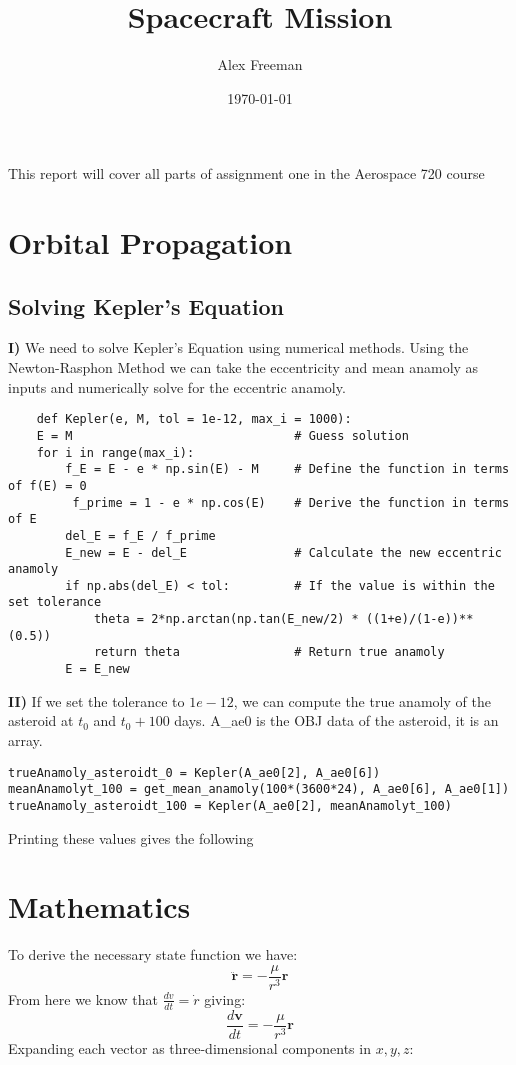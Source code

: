 \documentclass[a4paper, 12pt]{article}  %
\title{Spacecraft Mission}
\author{Alex Freeman}
\date{\today}
\begin{document}
\maketitle


This report will cover all parts of assignment one in the Aerospace 720 course

\section{Orbital Propagation}

\subsection{Solving Kepler's Equation}

\textbf{I)} We need to solve Kepler's Equation using numerical methods. Using the Newton-Rasphon Method we can take the eccentricity and mean anamoly as 
inputs and numerically solve for the eccentric anamoly. 

\begin{lstlisting}
    def Kepler(e, M, tol = 1e-12, max_i = 1000):
    E = M                               # Guess solution
    for i in range(max_i):
        f_E = E - e * np.sin(E) - M     # Define the function in terms of f(E) = 0
         f_prime = 1 - e * np.cos(E)    # Derive the function in terms of E
        del_E = f_E / f_prime           
        E_new = E - del_E               # Calculate the new eccentric anamoly
        if np.abs(del_E) < tol:         # If the value is within the set tolerance 
            theta = 2*np.arctan(np.tan(E_new/2) * ((1+e)/(1-e))**(0.5))
            return theta                # Return true anamoly
        E = E_new
\end{lstlisting}

\noindent \textbf{II)} If we set the tolerance to $1e-12$, we can compute the true anamoly of the asteroid 
at $t_0$ and $t_0 + 100$ days. A\_ae0 is the OBJ data of the asteroid, it is an array.
\begin{lstlisting}
trueAnamoly_asteroidt_0 = Kepler(A_ae0[2], A_ae0[6])  
meanAnamolyt_100 = get_mean_anamoly(100*(3600*24), A_ae0[6], A_ae0[1])
trueAnamoly_asteroidt_100 = Kepler(A_ae0[2], meanAnamolyt_100)
\end{lstlisting}
Printing these values gives the following



\section{Mathematics}
To derive the necessary state function we have:
\begin{equation}
    \ddot{\mathbf{r}} = -\frac{\mu}{r^3} \mathbf{r}
\end{equation}
From here we know that $\frac{dv}{dt} = \dot{r}$ giving:
\begin{equation}
    \frac{d\mathbf{v}}{dt} = -\frac{\mu}{r^3} \mathbf{r}
\end{equation}
Expanding each vector as three-dimensional components in $x,y,z$:
\end{document}

